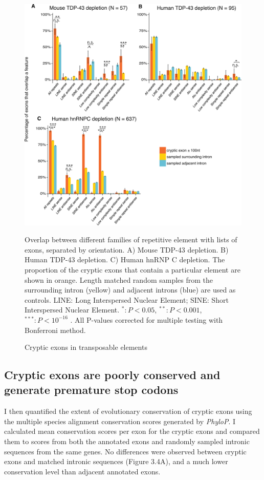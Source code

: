 \begin{figure}[h!]
	\begin{center}
		\includegraphics[width=14cm]{Figures/03_cryptic_exons/Figure_3_repeat_elements.png}
	\end{center}
	\caption{Cryptic exons in transposable elements}
		Overlap between different families of repetitive element with lists of exons, separated by orientation. A) Mouse TDP-43 depletion. B) Human TDP-43 depletion. C) Human hnRNP C depletion. The proportion of the cryptic exons that contain a particular element are shown in orange. Length matched random samples from the surrounding intron (yellow) and adjacent introns (blue) are used as controls. LINE: Long Interspersed Nuclear Element; SINE: Short Interspersed Nuclear Element.  $^*: P < 0.05$, $^{**}: P < 0.001$, $^{***}: P < 10^{-16}$ . All P-values corrected for multiple testing with Bonferroni method.
\end{figure}

\subsection{Cryptic exons are poorly conserved and generate premature stop codons}
I then quantified the extent of evolutionary conservation of cryptic exons using the multiple species alignment conservation scores generated by \textit{PhyloP}. I calculated mean conservation scores per exon for the cryptic exons and compared them to scores from both the annotated exons and randomly sampled intronic sequences from the same genes. No differences were observed between cryptic exons and matched intronic sequences (Figure 3.4A), and a much lower conservation level than adjacent annotated exons.

